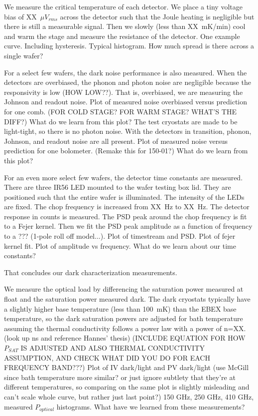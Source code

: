 We measure the critical temperature of each detector. 
We place a tiny voltage bias of XX~$\mu V_{rms}$ across the detector such that the Joule heating is negligible but there is still a measurable signal. 
Then we slowly (less than XX~mK/min) cool and warm the stage and measure the resistance of the detector. 
One example curve. Including hysteresis. 
Typical histogram. How much spread is there across a single wafer?

For a select few wafers, the dark noise performance is also measured. 
When the detectors are overbiased, the phonon and photon noise are negligible because the responsivity is low (HOW LOW??). 
That is, overbiased, we are measuring the Johnson and readout noise. 
Plot of measured noise overbiased versus prediction for one comb. (FOR COLD STAGE? FOR WARM STAGE? WHAT'S THE DIFF?)
What do we learn from this plot? 
The test cryostats are made to be light-tight, so there is no photon noise. 
With the detectors in transition, phonon, Johnson, and readout noise are all present. 
Plot of measured noise versus prediction for one bolometer. (Remake this for 150-01?)
What do we learn from this plot?

For an even more select few wafers, the detector time constants are measured. 
There are three IR56 LED mounted to the wafer testing box lid.
They are positioned such that the entire wafer is illuminated. 
The intensity of the LEDs are fixed. The chop frequency is increased from XX~Hz to XX~Hz. The detector response in counts is measured. The PSD peak around the chop frequency is fit to a Fejer kernel. 
Then we fit the PSD peak amplitude as a function of frequency to a ??? (1-pole roll off model...).
Plot of timestream and PSD. 
Plot of fejer kernel fit. 
Plot of amplitude vs frequency. 
What do we learn about our time constants?

That concludes our dark characterization measurements. 
 
We measure the optical load by differencing the saturation power measured at float and the saturation power measured dark. 
The dark cryostats typically have a slightly higher base temperature (less than 100~mK) than the \ac{EBEX} base temperature, so the dark saturation powers are adjusted for bath temperature assuming the thermal conductivity follows a power law with a power of n=XX. (look up ns and reference Hannes' thesis)
(INCLUDE EQUATION FOR HOW $P_{SAT}$ IS ADJUSTED AND ALSO THERMAL CONDUCTIVITY ASSUMPTION, AND CHECK WHAT DID YOU DO FOR EACH FREQUENCY BAND???)
Plot of IV dark/light and PV dark/light (use McGill since bath temperature more similar? or just ignore subtlety that they're at different temperatures, so comparing on the same plot is slightly misleading and can't scale whole curve, but rather just last point?)
150 GHz, 250 GHz, 410 GHz, measured $P_{optical}$ histograms.
What have we learned from these measurements?

